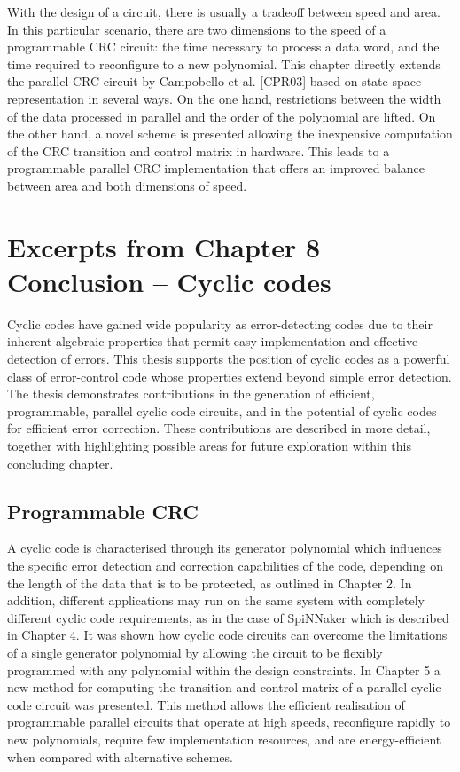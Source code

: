 \documentclass[oneside, a4paper, 11pt]{memoir}
\begin{document}
With the design of a circuit, there is usually a tradeoff between speed and area. In this particular scenario, there are two dimensions to the speed of a programmable CRC circuit: the time necessary to process a data word, and the time required to reconfigure to a new polynomial. This chapter directly extends the parallel CRC circuit by Campobello et al. [CPR03] based on state space representation in several ways. On the one hand, restrictions between the width of the data processed in parallel and the order of the polynomial are lifted. On the other hand, a novel scheme is presented allowing the inexpensive computation of the CRC transition and control matrix in hardware. This leads to a programmable parallel CRC implementation that offers an improved balance between area and both dimensions of speed.

\newpage
\section{Excerpts from Chapter 8 Conclusion -- Cyclic codes}
Cyclic codes have gained wide popularity as error-detecting codes due to their inherent algebraic properties that permit easy implementation and effective detection of errors. This thesis supports the position of cyclic codes as a powerful class of error-control code whose properties extend beyond simple error detection. The thesis demonstrates contributions in the generation of efficient, programmable, parallel cyclic code circuits, and in the potential of cyclic codes for efficient error correction. These contributions are described in more detail, together with highlighting possible areas for future exploration within this concluding chapter.

\subsection{Programmable CRC}
A cyclic code is characterised through its generator polynomial which influences the specific error detection and correction capabilities of the code, depending on the length of the data that is to be protected, as outlined in Chapter 2. In addition, different applications may run on the same system with completely different cyclic code requirements, as in the case of SpiNNaker which is described in Chapter 4. It was shown how cyclic code circuits can overcome the limitations of a single generator polynomial by allowing the circuit to be flexibly programmed with any polynomial within the design constraints. In Chapter 5 a new method for computing the transition and control matrix of a parallel cyclic code circuit was presented. This method allows the efficient realisation of programmable parallel circuits that operate at high speeds, reconfigure rapidly to new polynomials, require few implementation resources, and are energy-efficient when compared with alternative schemes.
\end{document}
